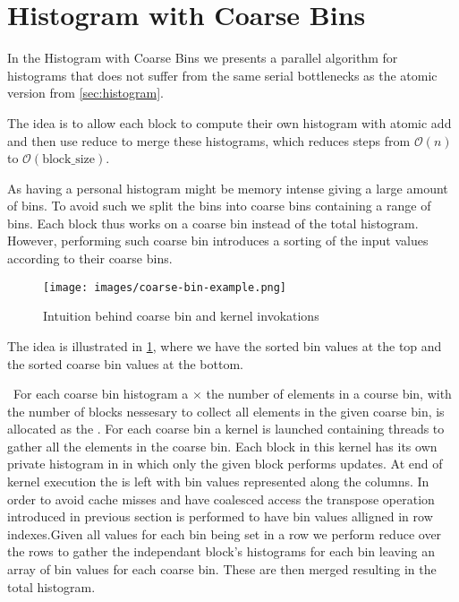 \section{Histogram with Coarse Bins}
\label{sec:coarse bin histogram}

In the Histogram with Coarse Bins we presents a parallel algorithm for histograms that does not suffer from the same serial bottlenecks as the atomic version from \cref{sec:histogram}.

The idea is to allow each block to compute their own histogram with atomic add and then use reduce to merge these histograms, which reduces steps from $\mathcal{O}(n)$ to $\mathcal{O}(\mathrm{block\_size})$.

As having a personal histogram might be memory intense giving a large amount of bins.
To avoid such we split the bins into coarse bins containing a range of bins.
Each block thus works on a coarse bin instead of the total histogram.
However, performing such coarse bin introduces a sorting of the input values according to their coarse bins.
\begin{figure}[htb]
  \centering
  \texttt{[image: images/coarse-bin-example.png]}
  \caption{Intuition behind coarse bin and kernel invokations}
  \label{fig:coarse bins example}
\end{figure}
The idea is illustrated in \cref{fig:coarse bins example}, where we have the sorted bin values at the top and the sorted coarse bin values at the bottom.

\
For each coarse bin histogram a  $\times$ the number of elements in a course bin, with  the number of blocks nessesary to collect all elements in the given coarse bin, is allocated as the .
For each coarse bin a kernel is launched containing threads to gather all the elements in the coarse bin.
Each block in this kernel has its own private histogram in  in which only the given block performs updates.
At end of kernel execution the \ttt{coarse\_bin\_grid} is left with bin values represented along the columns.
In order to avoid cache misses and have coalesced access the transpose operation introduced in previous section is performed to have bin values alligned in row indexes.Given all values for each bin being set in a row we perform reduce over the rows to gather the independant block's histograms for each bin leaving an array of bin values for each coarse bin.
These are then merged resulting in the total histogram.

